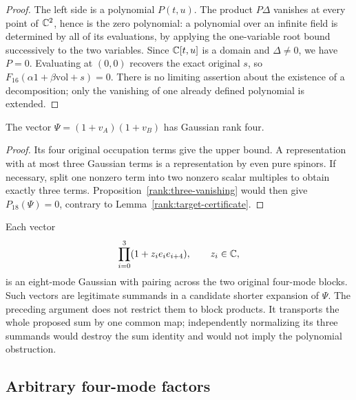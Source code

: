 \begin{proof}
The left side is a polynomial $P(t,u)$. The product $P\Delta$ vanishes
at every point of $\mathbb C^2$, hence is the zero polynomial: a polynomial over
an infinite field is determined by all of its evaluations, by applying
the one-variable root bound successively to the two variables.
Since $\mathbb C[t,u]$ is a domain and $\Delta\ne0$, we have $P=0$.
Evaluating at $(0,0)$ recovers the exact original $s$, so
$F_{16}(\alpha1+\beta\mathrm{vol}+s)=0$.
There is no limiting assertion about the existence of a decomposition;
only the vanishing of one already defined polynomial is extended.
\end{proof}

\begin{corollary}\label{rank:two-copy}
The vector $\Psi=(1+v_A)(1+v_B)$ has Gaussian rank four.
\end{corollary}
\begin{proof}
Its four original occupation terms give the upper bound. A representation
with at most three Gaussian terms is a representation by even pure
spinors. If necessary, split one nonzero term into two nonzero scalar
multiples to obtain exactly three terms. Proposition~\ref{rank:three-vanishing}
would then give $P_{18}(\Psi)=0$, contrary to
Lemma~\ref{rank:target-certificate}.
\end{proof}

\begin{example}\label{rank:cross-pairing-example}
Each vector
\[
 \prod_{i=0}^3(1+z_i e_ie_{i+4}),\qquad z_i\in\mathbb C,
\]
is an eight-mode Gaussian with pairing across the two original four-mode
blocks. Such vectors are legitimate summands in a candidate shorter
expansion of $\Psi$. The preceding argument does not restrict them to
block products. It transports the whole proposed sum by one common map;
independently normalizing its three summands would destroy the sum identity
and would not imply the polynomial obstruction.
\end{example}

\subsection{Arbitrary four-mode factors}


